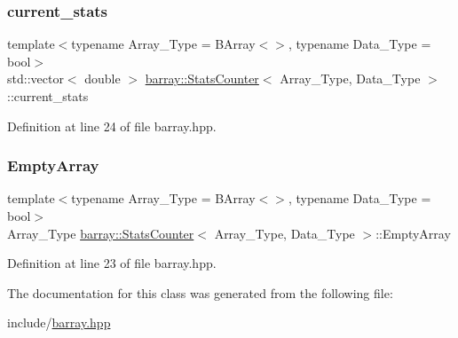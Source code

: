 \subsubsection{\texorpdfstring{current\+\_\+stats}{current\_stats}}
{\footnotesize\ttfamily template$<$typename Array\+\_\+\+Type  = B\+Array$<$$>$, typename Data\+\_\+\+Type  = bool$>$ \\
std\+::vector$<$ double $>$ \hyperlink{classbarray_1_1_stats_counter}{barray\+::\+Stats\+Counter}$<$ Array\+\_\+\+Type, Data\+\_\+\+Type $>$\+::current\+\_\+stats}



Definition at line 24 of file barray.\+hpp.

\mbox{\label{classbarray_1_1_stats_counter_a5882e329a534159cd0f536cab41766a2}} 
\subsubsection{\texorpdfstring{Empty\+Array}{EmptyArray}}
{\footnotesize\ttfamily template$<$typename Array\+\_\+\+Type  = B\+Array$<$$>$, typename Data\+\_\+\+Type  = bool$>$ \\
Array\+\_\+\+Type \hyperlink{classbarray_1_1_stats_counter}{barray\+::\+Stats\+Counter}$<$ Array\+\_\+\+Type, Data\+\_\+\+Type $>$\+::Empty\+Array}



Definition at line 23 of file barray.\+hpp.



The documentation for this class was generated from the following file\+:\begin{DoxyCompactItemize}
\item 
include/\hyperlink{barray_8hpp}{barray.\+hpp}\end{DoxyCompactItemize}
